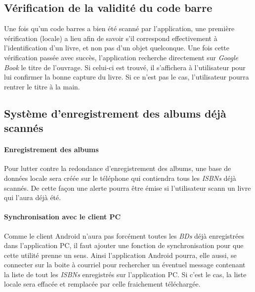 \subsection{Vérification de la validité du code barre}
Une fois qu'un code barres a bien été scanné par l'application, 
	 une première vérification (locale) a lieu afin de savoir s'il correspond effectivement à l'identification d'un livre, et non pas d'un objet quelconque. 
Une fois cette vérification passée avec succès, l'application recherche directement sur \emph{Google Book} le titre de l'ouvrage. Si celui-ci est trouvé, il s'affichera à l'utilisateur pour lui confirmer la bonne capture du livre. 
Si ce n'est pas le cas, l'utilisateur pourra rentrer le titre à la main. 

\subsection{Système d'enregistrement des albums déjà scannés}

\paragraph{Enregistrement des albums}
Pour lutter contre la redondance d'enregistrement des albums, une base de données locale sera créée sur le téléphone qui contiendra tous les \emph{ISBNs} déjà scannés. 
De cette façon une alerte pourra être émise si l'utilisateur scann un livre qui l'aura déjà été. 

\paragraph{Synchronisation avec le client PC}
Comme le client Android n'aura pas forcément toutes les \emph{BDs} déjà enregistrées dans l'application PC, 
il faut ajouter une fonction de synchronisation pour que cette utilité prenne un sens.
Ainsi l'application Android pourra, elle aussi, se connecter sur la boite à courriel pour rechercher un éventuel message contenant la liste de tout les \emph{ISBNs} enregistrés sur l'application PC. 
Si c'est le cas, la liste locale sera effacée et remplacée par celle fraichement téléchargée.
